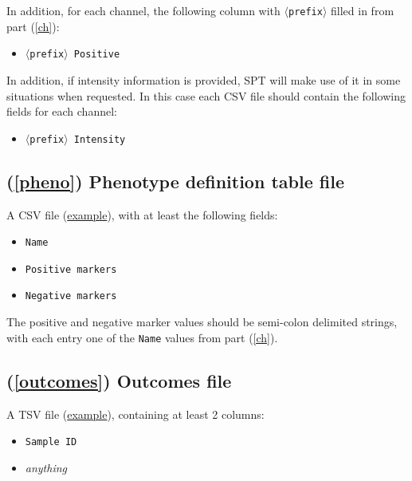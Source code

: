 \documentclass[14pt]{article}
\begin{document}
In addition, for each channel, the following column with \colorbox{yellow!25}{\texttt{$\langle$prefix$\rangle$}} filled in from part (\ref{ch}):

\begin{itemize}
  \itemsep0em
  \item[]{\colorbox{yellow!25}{\texttt{$\langle$prefix$\rangle$ Positive}}}
\end{itemize}


In addition, if intensity information is provided, SPT will make use of it in some situations when requested. In this case each CSV file should contain the following fields for each channel:

\begin{itemize}
  \itemsep0em
  \item[]{\colorbox{yellow!25}{\texttt{$\langle$prefix$\rangle$ Intensity}}}
\end{itemize}

\subsection*{(\ref{pheno}) Phenotype definition table file} A CSV file (\href{https://github.com/nadeemlab/SPT/blob/main/tests/data/complex_phenotypes.csv}{example}), with at least the following fields:

\begin{itemize}
  \itemsep0em
  \item[]{\colorbox{yellow!25}{\texttt{Name}}}
  \item[]{\colorbox{yellow!25}{\texttt{Positive markers}}}
  \item[]{\colorbox{yellow!25}{\texttt{Negative markers}}}
\end{itemize}

The positive and negative marker values should be semi-colon delimited strings, with each entry one of the \colorbox{yellow!25}{\texttt{Name}} values from part (\ref{ch}).

\subsection*{(\ref{outcomes}) Outcomes file} A TSV file (\href{https://github.com/nadeemlab/SPT/blob/main/tests/data/diagnosis.tsv}{example}), containing at least 2 columns:

\begin{itemize}
  \itemsep0em
  \item[]{\colorbox{yellow!25}{\texttt{Sample ID}}}
  \item[]{\colorbox{yellow!25}{\emph{anything}}}
\end{itemize}
\end{document}
